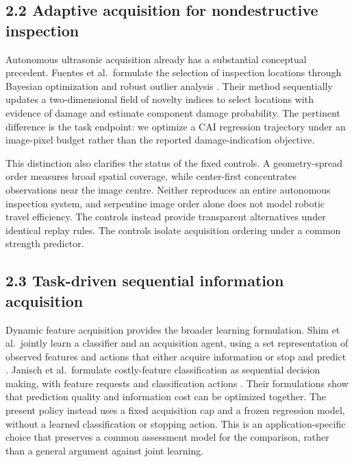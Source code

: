 \subsection{2.2 Adaptive acquisition for nondestructive inspection}\label{adaptive-acquisition-for-nondestructive-inspection}

Autonomous ultrasonic acquisition already has a substantial conceptual precedent. Fuentes et al.~formulate the selection of inspection locations through Bayesian optimization and robust outlier analysis \citep{fuentes2020}. Their method sequentially updates a two-dimensional field of novelty indices to select locations with evidence of damage and estimate component damage probability. The pertinent difference is the task endpoint: we optimize a CAI regression trajectory under an image-pixel budget rather than the reported damage-indication objective.

This distinction also clarifies the status of the fixed controls. A geometry-spread order measures broad spatial coverage, while center-first concentrates observations near the image centre. Neither reproduces an entire autonomous inspection system, and serpentine image order alone does not model robotic travel efficiency. The controls instead provide transparent alternatives under identical replay rules. The controls isolate acquisition ordering under a common strength predictor.

\subsection{2.3 Task-driven sequential information acquisition}\label{task-driven-sequential-information-acquisition}

Dynamic feature acquisition provides the broader learning formulation. Shim et al.~jointly learn a classifier and an acquisition agent, using a set representation of observed features and actions that either acquire information or stop and predict \citep{shim2018}. Janisch et al.~formulate costly-feature classification as sequential decision making, with feature requests and classification actions \citep{janisch2019}. Their formulations show that prediction quality and information cost can be optimized together. The present policy instead uses a fixed acquisition cap and a frozen regression model, without a learned classification or stopping action. This is an application-specific choice that preserves a common assessment model for the comparison, rather than a general argument against joint learning.

